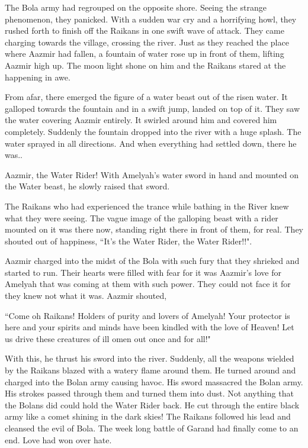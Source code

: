 \documentclass[twoside,11pt,titlepage]{article}
\begin{document}
The Bola army had regrouped on the opposite shore. Seeing the strange phenomenon, they panicked. With a sudden war cry and a horrifying howl, they rushed forth to finish off the Raikans in one swift wave of attack. They came charging towards the village, crossing the river. Just as they reached the place where Aazmir had fallen, a fountain of water rose up in front of them, lifting Aazmir high up. The moon light shone on him and the Raikans stared at the happening in awe.

From afar, there emerged the figure of a water beast out of the risen water. It galloped towards the fountain and in a swift jump, landed on top of it. They saw the water covering Aazmir entirely. It swirled around him and covered him completely. Suddenly the fountain dropped into the river with a huge splash. The water sprayed in all directions. And when everything had settled down, there he was..

Aazmir, the Water Rider! With Amelyah's water sword in hand and mounted on the Water beast, he slowly raised that sword.

The Raikans who had experienced the trance while bathing in the River knew what they were seeing. The vague image of the galloping beast with a rider mounted on it was there now, standing right there in front of them, for real. They shouted out of happiness, ``It's the Water Rider, the Water Rider!!".

Aazmir charged into the midst of the Bola with such fury that they shrieked and started to run. Their hearts were filled with fear for it was Aazmir's love for Amelyah that was coming at them with such power. They could not face it for they knew not what it was. Aazmir shouted,

``Come oh Raikans! Holders of purity and lovers of Amelyah! Your protector is here and your spirits and minds have been kindled with the love of Heaven! Let us drive these creatures of ill omen out once and for all!"

With this, he thrust his sword into the river. Suddenly, all the weapons wielded by the Raikans blazed with a watery flame around them. He turned around and charged into the Bolan army causing havoc. His sword massacred the Bolan army. His strokes passed through them and turned them into dust. Not anything that the Bolans did could hold the Water Rider back. He cut through the entire black army like a comet shining in the dark skies! The Raikans followed his lead and cleansed the evil of Bola. The week long battle of Garand had finally come to an end. Love had won over hate.
\end{document}
